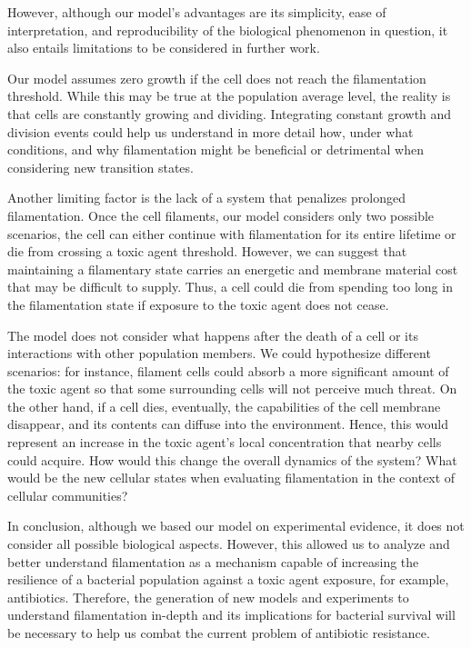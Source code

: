 \documentclass[
  12pt,
  a4paper,
  oneside]{krantz}
\begin{document}
However, although our model's advantages are its simplicity, ease of
interpretation, and reproducibility of the biological phenomenon in
question, it also entails limitations to be considered in further work.

Our model assumes zero growth if the cell does not reach the
filamentation threshold. While this may be true at the population
average level, the reality is that cells are constantly growing and
dividing. Integrating constant growth and division events could help us
understand in more detail how, under what conditions, and why
filamentation might be beneficial or detrimental when considering new
transition states.

Another limiting factor is the lack of a system that penalizes prolonged
filamentation. Once the cell filaments, our model considers only two
possible scenarios, the cell can either continue with filamentation for
its entire lifetime or die from crossing a toxic agent threshold.
However, we can suggest that maintaining a filamentary state carries an
energetic and membrane material cost that may be difficult to supply.
Thus, a cell could die from spending too long in the filamentation state
if exposure to the toxic agent does not cease.

The model does not consider what happens after the death of a cell or
its interactions with other population members. We could hypothesize
different scenarios: for instance, filament cells could absorb a more
significant amount of the toxic agent so that some surrounding cells
will not perceive much threat. On the other hand, if a cell dies,
eventually, the capabilities of the cell membrane disappear, and its
contents can diffuse into the environment. Hence, this would represent
an increase in the toxic agent's local concentration that nearby cells
could acquire. How would this change the overall dynamics of the system?
What would be the new cellular states when evaluating filamentation in
the context of cellular communities?

In conclusion, although we based our model on experimental evidence, it
does not consider all possible biological aspects. However, this allowed
us to analyze and better understand filamentation as a mechanism capable
of increasing the resilience of a bacterial population against a toxic
agent exposure, for example, antibiotics. Therefore, the generation of
new models and experiments to understand filamentation in-depth and its
implications for bacterial survival will be necessary to help us combat
the current problem of antibiotic resistance.
\end{document}
